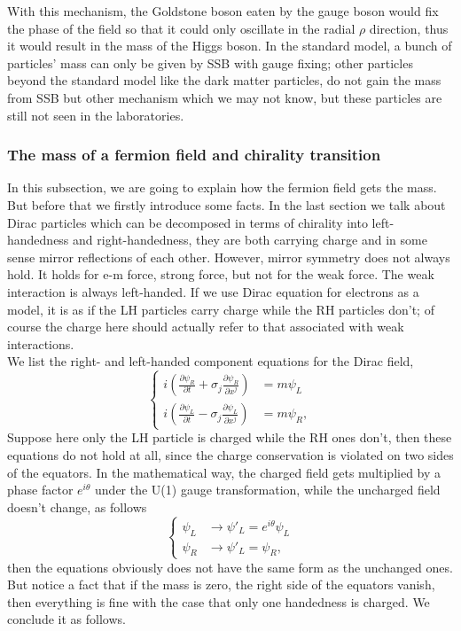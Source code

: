 \documentclass{article}
\newcommand{\be}{\begin{equation}}
\newcommand{\ee}{\end{equation}}
\newcommand{\p}{\partial}
\renewcommand{\1}{\left}
\renewcommand{\2}{\right}
\newcommand{\sig}{\sigma}
\renewcommand{\th}{\theta}
\begin{document}
With this mechanism, the Goldstone boson eaten by the gauge boson would fix the phase of the field so that it could only oscillate in the radial $\rho$ direction, thus it would result in the mass of the Higgs boson. In the standard model, a bunch of particles' mass can only be given by SSB with gauge fixing; other particles beyond the standard model like the dark matter particles, do not gain the mass from SSB but other mechanism which we may not know, but these particles are still not seen in the laboratories.\\

\subsubsection{The mass of a fermion field and chirality transition}
In this subsection, we are going to explain how the fermion field gets the mass. But before that we firstly introduce some facts. In the last section we talk about Dirac particles which can be decomposed in terms of chirality into left-handedness and right-handedness, they are both carrying charge and in some sense mirror reflections of each other. However, mirror symmetry does not always hold. It holds for e-m force, strong force, but not for  the weak force. The weak interaction is always left-handed. If we use Dirac equation for electrons as a model, it is as if the LH particles carry charge while the RH particles don't; of course the charge here should actually refer to that associated with weak interactions.\\
We list the right- and left-handed component equations for the Dirac field,
\be\1\{\begin{split}
i\1(\frac{\p\psi_R}{\p t}+\sig_j\frac{\p\psi_R}{\p x^j}\2)&=m\psi_L\\
i\1(\frac{\p\psi_L}{\p t}-\sig_j\frac{\p\psi_L}{\p x^j}\2)&=m\psi_R,
\end{split}\2.\ee
Suppose here only the LH particle is charged while the RH ones don't, then these equations do not hold at all, since the charge conservation is violated on two sides of the equators. In the mathematical way, the charged field gets multiplied by a phase factor $e^{i\th}$ under the U(1) gauge transformation, while the uncharged field doesn't change, as follows
\be\1\{\begin{split}
\psi_L &\rightarrow \psi'_L=e^{i\th}\psi_L\\
\psi_R &\rightarrow \psi'_L=\psi_R,
\end{split}\2.\ee
then the equations obviously does not have the same form as the unchanged ones. But notice a fact that if the mass is zero, the right side of the equators vanish, then everything is fine with the case that only one handedness is charged. We conclude it as follows.\\
\end{document}
